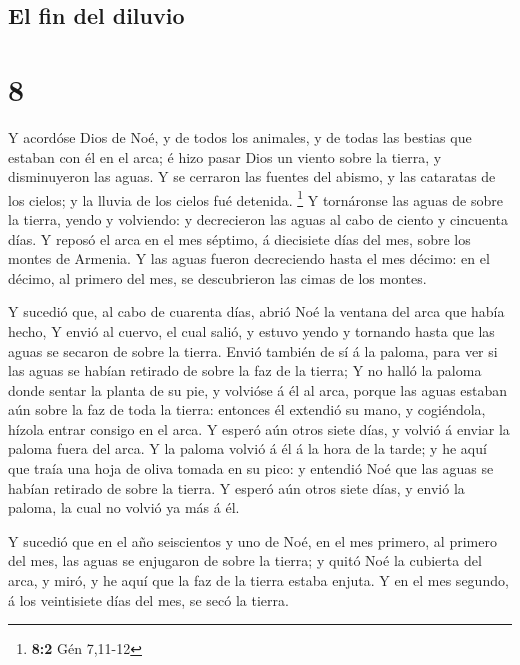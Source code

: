 \hypertarget{el-fin-del-diluvio}{%
\subsection{El fin del diluvio}\label{el-fin-del-diluvio}}

\hypertarget{section-7}{%
\section{8}\label{section-7}}

 Y acordóse Dios de Noé, y de todos los animales, y de
todas las bestias que estaban con él en el arca; é hizo pasar Dios un
viento sobre la tierra, y disminuyeron las aguas.  Y se
cerraron las fuentes del abismo, y las cataratas de los cielos; y la
lluvia de los cielos fué detenida. \footnote{\textbf{8:2} Gén 7,11-12}
 Y tornáronse las aguas de sobre la tierra, yendo y
volviendo: y decrecieron las aguas al cabo de ciento y cincuenta días.
 Y reposó el arca en el mes séptimo, á diecisiete días del
mes, sobre los montes de Armenia.  Y las aguas fueron
decreciendo hasta el mes décimo: en el décimo, al primero del mes, se
descubrieron las cimas de los montes.

 Y sucedió que, al cabo de cuarenta días, abrió Noé la
ventana del arca que había hecho,  Y envió al cuervo, el
cual salió, y estuvo yendo y tornando hasta que las aguas se secaron de
sobre la tierra.  Envió también de sí á la paloma, para
ver si las aguas se habían retirado de sobre la faz de la tierra;
 Y no halló la paloma donde sentar la planta de su pie, y
volvióse á él al arca, porque las aguas estaban aún sobre la faz de toda
la tierra: entonces él extendió su mano, y cogiéndola, hízola entrar
consigo en el arca.  Y esperó aún otros siete días, y
volvió á enviar la paloma fuera del arca.  Y la paloma
volvió á él á la hora de la tarde; y he aquí que traía una hoja de oliva
tomada en su pico: y entendió Noé que las aguas se habían retirado de
sobre la tierra.  Y esperó aún otros siete días, y envió
la paloma, la cual no volvió ya más á él.

 Y sucedió que en el año seiscientos y uno de Noé, en el
mes primero, al primero del mes, las aguas se enjugaron de sobre la
tierra; y quitó Noé la cubierta del arca, y miró, y he aquí que la faz
de la tierra estaba enjuta.  Y en el mes segundo, á los
veintisiete días del mes, se secó la tierra.


